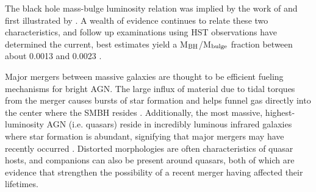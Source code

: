 \documentclass[manuscript]{aastex}
\begin{document}



The black hole mass-bulge luminosity relation was implied by the work of \cite{Dressler1988} and first illustrated by \cite{Kormendy1993}. A wealth of evidence continues to relate these two characteristics, and follow up examinations using HST observations have determined the current, best estimates yield a M$_{\rm BH}$/M$_{\rm bulge}$ fraction between about 0.0013 and 0.0023 \citep{Merritt2001a,McLure2001,Marconi2003}. 

Major mergers between massive galaxies are thought to be efficient fueling mechanisms for bright AGN. The large influx of material due to tidal torques from the merger causes bursts of star formation and helps funnel gas directly into the center where the SMBH resides \citep[e.g.][]{Richards2006,Reddy2008,Hopkins2010}. Additionally, the most massive, highest-luminosity AGN (i.e. quasars) reside in incredibly luminous infrared galaxies where star formation is abundant, signifying that major mergers may have recently occurred \citep{Treister2012}. Distorted morphologies are often characteristics of quasar hosts, and companions can also be present around quasars, both of which are evidence that strengthen the possibility of a recent merger having affected their lifetimes. 
\end{document}
